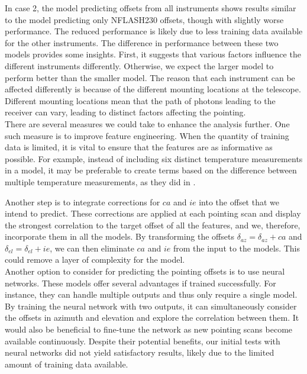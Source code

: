 In case 2, the model predicting offsets from all instruments shows results similar to the model predicting only NFLASH230 offsets, though with slightly worse performance.
The reduced performance is likely due to less training data available for the other instruments.
The difference in performance between these two models provides some insights.
First, it suggests that various factors influence the different instruments differently.
Otherwise, we expect the larger model to perform better than the smaller model.
The reason that each instrument can be affected differently is because of the different mounting locations at the telescope.
Different mounting locations mean that the path of photons leading to the receiver can vary, leading to distinct factors affecting the pointing.\\


There are several measures we could take to enhance the analysis further. One such measure is to improve feature engineering.
When the quantity of training data is limited, it is vital to ensure that the features are as informative as possible.
For example, instead of including six distinct temperature measurements in a model,
it may be preferable to create terms based on the difference between multiple temperature measurements, as they did in \cite{whitegreen2022}.

Another step is to integrate corrections for $ca$ and $ie$ into the offset that we intend to predict.
These corrections are applied at each pointing scan and display the strongest correlation to the target offset of all the features,
and we, therefore, incorporate them in all the models.
By transforming the offsets $\delta_{az}=\delta_{az} + ca$ and $\delta_{el}=\delta_{el} + ie$, we can then eliminate $ca$ and $ie$ from the input to the models.
This could remove a layer of complexity for the model.\\


Another option to consider for predicting the pointing offsets is to use neural networks.
These models offer several advantages if trained successfully.
For instance, they can handle multiple outputs and thus only require a single model.
By training the neural network with two outputs, it can simultaneously consider the offsets in azimuth and elevation and explore the correlation between them.
It would also be beneficial to fine-tune the network as new pointing scans become available continuously.
Despite their potential benefits, our initial tests with neural networks did not yield satisfactory results,
likely due to the limited amount of training data available.\\


